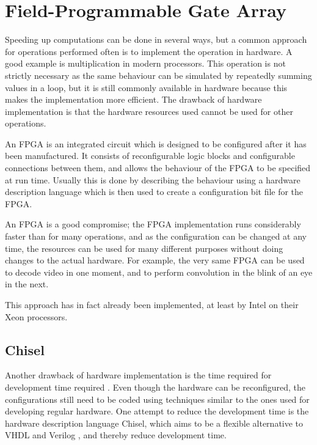 \section{Field-Programmable Gate Array}
Speeding up computations can be done in several ways, but a common approach for operations performed often is to implement the operation in hardware.
A good example is multiplication in modern processors.
This operation is not strictly necessary as the same behaviour can be simulated by repeatedly summing values in a loop, but it is still commonly available in hardware because this makes the implementation more efficient.
The drawback of hardware implementation is that the hardware resources used cannot be used for other operations.

An FPGA is an integrated circuit which is designed to be configured after it has been manufactured.
It consists of reconfigurable logic blocks and configurable connections between them, and allows the behaviour of the FPGA to be specified at run time. Usually this is done by describing the behaviour using a hardware description language which is then used to create a configuration bit file for the FPGA.

An FPGA is a good compromise; the FPGA implementation runs considerably faster than for many operations, and as the configuration can be changed at any time, the resources can be used for many different purposes without doing changes to the actual hardware.
For example, the very same FPGA can be used to decode video in one moment, and to perform convolution in the blink of an eye in the next.

This approach has in fact already been implemented, at least by Intel on their Xeon processors\cite{intelxeonfpga}.

\subsection{Chisel}
Another drawback of hardware implementation is the time required for development time required \cite{fpgaprosandcons}. 
Even though the hardware can be reconfigured, the configurations still need to be coded using techniques similar to the ones used for developing regular hardware.
One attempt to reduce the development time is the hardware description language Chisel, which aims to be a flexible alternative to VHDL and Verilog \cite{chiselpaper}, and thereby reduce development time.
